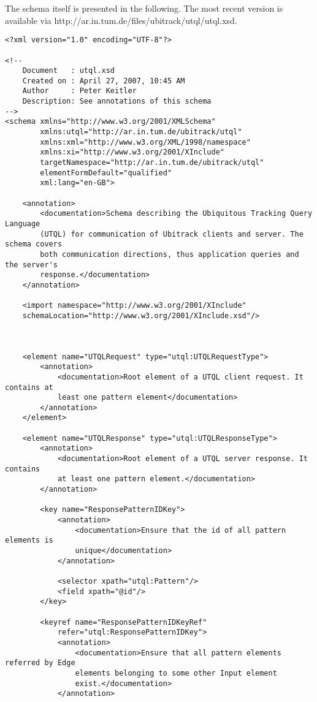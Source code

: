 \documentclass[11pt]{article}
\begin{document}
The schema itself is presented in the following. 
The most recent version is available via http://ar.in.tum.de/files/ubitrack/utql/utql.xsd.

\begin{Verbatim}[fontsize=\footnotesize,tabsize=2]
<?xml version="1.0" encoding="UTF-8"?>

<!--
    Document   : utql.xsd
    Created on : April 27, 2007, 10:45 AM
    Author     : Peter Keitler
    Description: See annotations of this schema
-->
<schema xmlns="http://www.w3.org/2001/XMLSchema" 
        xmlns:utql="http://ar.in.tum.de/ubitrack/utql"
        xmlns:xml="http://www.w3.org/XML/1998/namespace"
        xmlns:xi="http://www.w3.org/2001/XInclude"
        targetNamespace="http://ar.in.tum.de/ubitrack/utql" 
        elementFormDefault="qualified"
        xml:lang="en-GB">
  
    <annotation>
		<documentation>Schema describing the Ubiquitous Tracking Query Language
		(UTQL) for communication of Ubitrack clients and server. The schema covers
		both communication directions, thus application queries and the server's
		response.</documentation>
    </annotation>
    
    <import namespace="http://www.w3.org/2001/XInclude"
    schemaLocation="http://www.w3.org/2001/XInclude.xsd"/>
    
    
    
    <element name="UTQLRequest" type="utql:UTQLRequestType">
        <annotation>
            <documentation>Root element of a UTQL client request. It contains at
            least one pattern element</documentation>
        </annotation>
    </element>
    
    <element name="UTQLResponse" type="utql:UTQLResponseType">
        <annotation>
            <documentation>Root element of a UTQL server response. It contains
            at least one pattern element.</documentation>
        </annotation>

        <key name="ResponsePatternIDKey">
            <annotation>
                <documentation>Ensure that the id of all pattern elements is
                unique</documentation>
            </annotation>
            
            <selector xpath="utql:Pattern"/>
            <field xpath="@id"/>
        </key>
        
        <keyref name="ResponsePatternIDKeyRef"
            refer="utql:ResponsePatternIDKey">
            <annotation>
                <documentation>Ensure that all pattern elements referred by Edge
                elements belonging to some other Input element
                exist.</documentation>
            </annotation>
            

\end{Verbatim}
\end{document}
